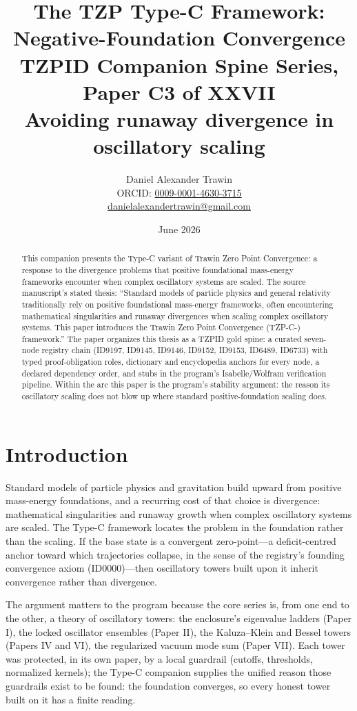 \documentclass[11pt]{article}
\title{The TZP Type-C Framework: Negative-Foundation Convergence\\[0.6em]
\large TZPID Companion Spine Series, Paper C3 of XXVII\\
\normalsize Avoiding runaway divergence in oscillatory scaling}
\author{Daniel Alexander Trawin\\
\small ORCID: \href{https://orcid.org/0009-0001-4630-3715}{0009-0001-4630-3715}\\
\small \href{mailto:danielalexandertrawin@gmail.com}{danielalexandertrawin@gmail.com}}
\date{June 2026}
\theoremstyle{remark}
\begin{document}
\maketitle

\begin{abstract}
This companion presents the Type-C variant of Trawin Zero Point Convergence: a response to the divergence problems that positive foundational mass-energy frameworks encounter when complex oscillatory systems are scaled.
The source manuscript's stated thesis: ``Standard models of particle physics and general relativity traditionally rely on positive foundational mass-energy frameworks, often encountering mathematical singularities and runaway divergences when scaling complex oscillatory systems. This paper introduces the Trawin Zero Point Convergence (TZP-C-) framework.'' The paper organizes this thesis as a TZPID gold spine: a curated seven-node registry chain (ID9197, ID9145, ID9146, ID9152, ID9153, ID6489, ID6733) with typed proof-obligation roles, dictionary and encyclopedia anchors for every node, a declared dependency order, and stubs in the program's Isabelle/Wolfram verification pipeline. Within the arc this paper is the program's stability argument: the reason its oscillatory scaling does not blow up where standard positive-foundation scaling does.
\end{abstract}

\section{Introduction}
\label{sec:intro}

Standard models of particle physics and gravitation build upward from positive mass-energy foundations, and a recurring cost of that choice is divergence: mathematical singularities and runaway growth when complex oscillatory systems are scaled. The Type-C framework locates the problem in the foundation rather than the scaling. If the base state is a convergent zero-point---a deficit-centred anchor toward which trajectories collapse, in the sense of the registry's founding convergence axiom (ID0000)---then oscillatory towers built upon it inherit convergence rather than divergence.

The argument matters to the program because the core series is, from one end to the other, a theory of oscillatory towers: the enclosure's eigenvalue ladders (Paper I), the locked oscillator ensembles (Paper II), the Kaluza--Klein and Bessel towers (Papers IV and VI), the regularized vacuum mode sum (Paper VII). Each tower was protected, in its own paper, by a local guardrail (cutoffs, thresholds, normalized kernels); the Type-C companion supplies the unified reason those guardrails exist to be found: the foundation converges, so every honest tower built on it has a finite reading.
\end{document}
